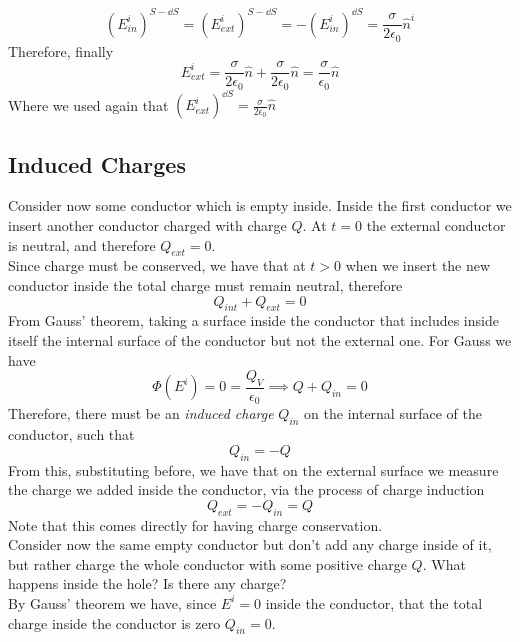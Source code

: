 \documentclass[../electromagnetism]{subfiles}
\begin{document}
\begin{equation*}
	\left(E^i_{in}\right)^{S-\dd S}=\left(E^i_{ext}\right)^{S-\dd S}=-\left(E^i_{in}\right)^{\dd S}=\frac{\sigma}{2\epsilon_0}\hat{n}^i
\end{equation*}
Therefore, finally
\begin{equation*}
	E^i_{ext}=\frac{\sigma}{2\epsilon_0}\hat{n}+\frac{\sigma}{2\epsilon_0}\hat{n}=\frac{\sigma}{\epsilon_0}\hat{n}
\end{equation*}
Where we used again that $\left(E^i_{ext}\right)^{\dd S}=\frac{\sigma}{2\epsilon_0}\hat{n}$
\subsection{Induced Charges}
Consider now some conductor which is empty inside. Inside the first conductor we insert another conductor charged with charge $Q$. At $t=0$ the external conductor is neutral, and therefore $Q_{ext}=0$.\\
Since charge must be conserved, we have that at $t>0$ when we insert the new conductor inside the total charge must remain neutral, therefore
\begin{equation*}
	Q_{int}+Q_{ext}=0
\end{equation*}
From Gauss' theorem, taking  a surface inside the conductor that includes inside itself the internal surface of the conductor but not the external one. For Gauss we have
\begin{equation*}
	\Phi(E^i)=0=\frac{Q_V}{\epsilon_0}\implies Q+Q_{in}=0
\end{equation*}
Therefore, there must be an \textit{induced charge} $Q_{in}$ on the internal surface of the conductor, such that
\begin{equation}
	Q_{in}=-Q
	\label{eq:inducedcharge}
\end{equation}
From this, substituting before, we have that on the external surface we measure the charge we added inside the conductor, via the process of charge induction
\begin{equation}
	Q_{ext}=-Q_{in}=Q
	\label{eq:chargemeas}
\end{equation}
Note that this comes directly for having charge conservation.\\
Consider now the same empty conductor but don't add any charge inside of it, but rather charge the whole conductor with some positive charge $Q$. What happens inside the hole? Is there any charge?\\
By Gauss' theorem we have, since $E^i=0$ inside the conductor, that the total charge inside the conductor is zero $Q_{in}=0$.\\
\end{document}
